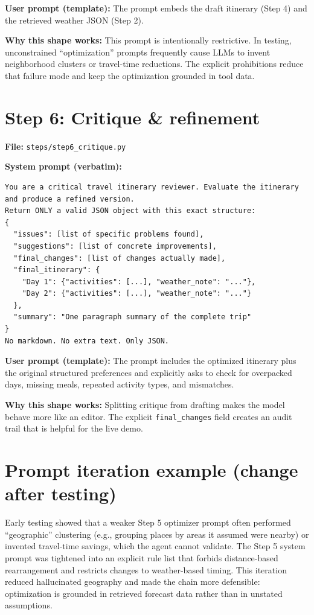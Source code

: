 \textbf{User prompt (template):} The prompt embeds the draft itinerary (Step 4) and the retrieved weather JSON (Step 2).

\textbf{Why this shape works:} This prompt is intentionally restrictive. In testing, unconstrained ``optimization'' prompts frequently cause LLMs to invent neighborhood clusters or travel-time reductions. The explicit prohibitions reduce that failure mode and keep the optimization grounded in tool data.

\section{Step 6: Critique \& refinement}
\textbf{File:} \texttt{steps/step6\_critique.py}

\textbf{System prompt (verbatim):}
\begin{lstlisting}[basicstyle=\ttfamily\small, breaklines=true, frame=single]
You are a critical travel itinerary reviewer. Evaluate the itinerary and produce a refined version.
Return ONLY a valid JSON object with this exact structure:
{
  "issues": [list of specific problems found],
  "suggestions": [list of concrete improvements],
  "final_changes": [list of changes actually made],
  "final_itinerary": {
    "Day 1": {"activities": [...], "weather_note": "..."},
    "Day 2": {"activities": [...], "weather_note": "..."}
  },
  "summary": "One paragraph summary of the complete trip"
}
No markdown. No extra text. Only JSON.
\end{lstlisting}

\textbf{User prompt (template):} The prompt includes the optimized itinerary plus the original structured preferences and explicitly asks to check for overpacked days, missing meals, repeated activity types, and mismatches.

\textbf{Why this shape works:} Splitting critique from drafting makes the model behave more like an editor. The explicit \texttt{final\_changes} field creates an audit trail that is helpful for the live demo.

\section{Prompt iteration example (change after testing)}
Early testing showed that a weaker Step 5 optimizer prompt often performed ``geographic'' clustering (e.g., grouping places by areas it assumed were nearby) or invented travel-time savings, which the agent cannot validate. The Step 5 system prompt was tightened into an explicit rule list that forbids distance-based rearrangement and restricts changes to weather-based timing. This iteration reduced hallucinated geography and made the chain more defensible: optimization is grounded in retrieved forecast data rather than in unstated assumptions.
